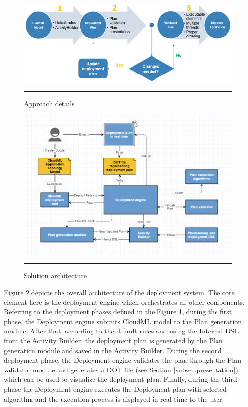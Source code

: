 \noindent 

\begin{figure}[htbp]
	\centering
		\includegraphics[width=38em]{./Figures/Details}
		\rule{38em}{0.5pt}
	\caption[Approach Details]{Approach details}
	\label{fig:details}
\end{figure}

\noindent 

\begin{figure}[htbp]
	\centering
		\includegraphics[width=38em]{./Figures/Architecture}
		\rule{38em}{0.5pt}
	\caption[Solution Architecture]{Solution architecture}
	\label{fig:architecture}
\end{figure}

\noindent 

\noindent Figure \ref{fig:architecture} depicts the overall architecture of the deployment system. The core element here is the deployment engine which orchestrates all other components. Referring to the deployment phases defined in the Figure \ref{fig:details}, during the first phase, the Deployment engine submits CloudML model to the Plan generation module. After that, according to the default rules and using the Internal DSL from the Activity Builder, the deployment plan is generated by the Plan generation module and saved in the Activity Builder. During the second deployment phase, the Deployment engine validates the plan through the Plan validator module and generates a DOT file (see Section \ref{subsec:presentation}) which can be used to visualize the deployment plan. Finally, during the third phase the Deployment engine executes the Deployment plan with selected algorithm and the execution process is displayed in real-time to the user.

